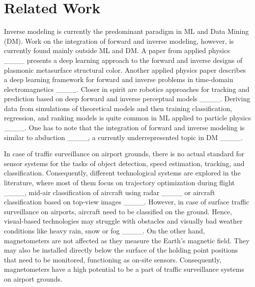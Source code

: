 \section{Related Work}
Inverse modeling is currently the predominant paradigm in ML and Data Mining (DM). 
Work on the integration of forward and inverse modeling, however, %
is currently found mainly outside ML and DM. A paper from applied physics  ____  presents a deep learning approach to the forward and inverse designs of plasmonic metasurface structural color. Another applied physics paper  describes a deep learning framework for forward and inverse problems in time-domain electromagnetics ____. 
Closer in spirit are robotics approaches for tracking and prediction based on deep forward and inverse perceptual models ____. Deriving data from simulations of theoretical models and then training classification, regression, and ranking models is quite common in ML applied to particle physics ____. One has to note that the integration of forward and inverse modeling is similar to abduction ____, a currently underrepresented topic in DM ____.

In case of traffic surveillance on airport grounds, there is no actual standard for sensor systems for the tasks of object detection, speed estimation, tracking, and classification. Consequently, different technological systems are explored in the literature, where most of them focus on trajectory optimization during flight ____, mid-air classification of aircraft using radar ____ or aircraft classification based on top-view images ____. %
However, in case of surface traffic surveillance on airports, aircraft need to be classified on the ground. Hence, visual-based technologies may struggle with obstacles and visually bad weather conditions like heavy rain, snow or fog ____. On the other hand, magnetometers are not affected as they measure the Earth's magnetic field. They may also be installed directly below the surface of the holding point positions that need to be monitored, functioning as on-site sensors. Consequently, magnetometers have a high potential to be a part of traffic surveillance systems on airport grounds.   

